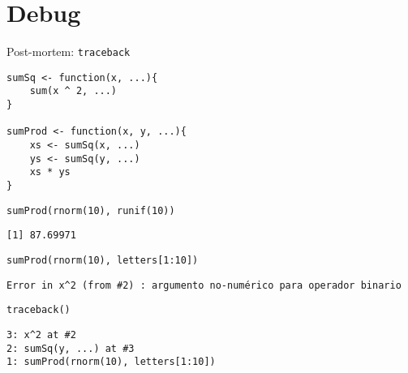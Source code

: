 \documentclass[xcolor={usenames,svgnames,dvipsnames}]{beamer}
\begin{document}
\section{Debug}
\label{sec:orgheadline25}

\begin{frame}[fragile,label={sec:orgheadline20}]{Post-mortem: \texttt{traceback}}
 \lstset{language=R,label= ,caption= ,captionpos=b,numbers=none}
\begin{lstlisting}
sumSq <- function(x, ...){
    sum(x ^ 2, ...)
}

sumProd <- function(x, y, ...){
    xs <- sumSq(x, ...)
    ys <- sumSq(y, ...)
    xs * ys
}
\end{lstlisting}

\lstset{language=R,label= ,caption= ,captionpos=b,numbers=none}
\begin{lstlisting}
sumProd(rnorm(10), runif(10))
\end{lstlisting}

\begin{verbatim}
[1] 87.69971
\end{verbatim}

\lstset{language=R,label= ,caption= ,captionpos=b,numbers=none}
\begin{lstlisting}
sumProd(rnorm(10), letters[1:10])
\end{lstlisting}

\begin{verbatim}
Error in x^2 (from #2) : argumento no-numérico para operador binario
\end{verbatim}

\lstset{language=R,label= ,caption= ,captionpos=b,numbers=none}
\begin{lstlisting}
traceback()
\end{lstlisting}

\begin{verbatim}
3: x^2 at #2
2: sumSq(y, ...) at #3
1: sumProd(rnorm(10), letters[1:10])
\end{verbatim}
\end{frame}
\end{document}
